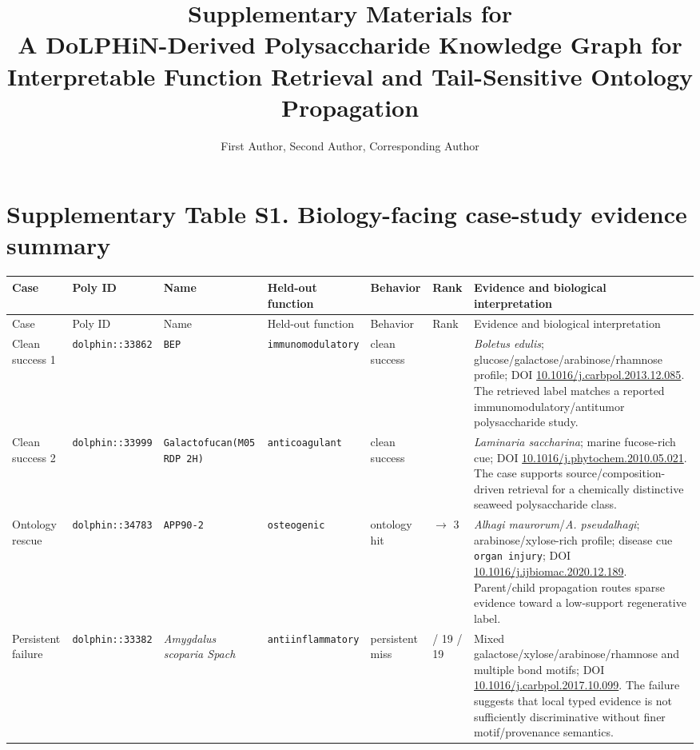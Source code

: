 \documentclass[11pt]{article}
\title{Supplementary Materials for\\A DoLPHiN-Derived Polysaccharide Knowledge Graph for Interpretable Function Retrieval and Tail-Sensitive Ontology Propagation}
\author{First Author, Second Author, Corresponding Author}
\date{}
\begin{document}
\maketitle
\setlength{\tabcolsep}{2pt}
\sloppy
\section*{Supplementary Table S1. Biology-facing case-study evidence summary}
\scriptsize
\begin{longtable}{>{\raggedright\arraybackslash}p{1.25cm}>{\raggedright\arraybackslash}p{1.25cm}>{\raggedright\arraybackslash}p{1.55cm}>{\raggedright\arraybackslash}p{1.45cm}>{\raggedright\arraybackslash}p{1.25cm}>{\raggedright\arraybackslash}p{0.9cm}>{\raggedright\arraybackslash}p{5.2cm}}
\toprule
Case & Poly ID & Name & Held-out function & Behavior & Rank & Evidence and biological interpretation \\
\midrule
\endfirsthead
\toprule
Case & Poly ID & Name & Held-out function & Behavior & Rank & Evidence and biological interpretation \\
\midrule
\endhead
Clean success 1 & \texttt{dolphin::33862} & \texttt{BEP} & \texttt{immunomodulatory} & clean success & 1 & \textit{Boletus edulis}; glucose/galactose/arabinose/rhamnose profile; DOI \url{10.1016/j.carbpol.2013.12.085}. The retrieved label matches a reported immunomodulatory/antitumor polysaccharide study. \\
Clean success 2 & \texttt{dolphin::33999} & \texttt{Galactofucan(M05 RDP 2H)} & \texttt{anticoagulant} & clean success & 1 & \textit{Laminaria saccharina}; marine fucose-rich cue; DOI \url{10.1016/j.phytochem.2010.05.021}. The case supports source/composition-driven retrieval for a chemically distinctive seaweed polysaccharide class. \\
Ontology rescue & \texttt{dolphin::34783} & \texttt{APP90-2} & \texttt{osteogenic} & ontology hit & 43 $\rightarrow$ 3 & \textit{Alhagi maurorum}/\textit{A. pseudalhagi}; arabinose/xylose-rich profile; disease cue \texttt{organ injury}; DOI \url{10.1016/j.ijbiomac.2020.12.189}. Parent/child propagation routes sparse evidence toward a low-support regenerative label. \\
Persistent failure & \texttt{dolphin::33382} & \textit{Amygdalus scoparia Spach} & \texttt{antiinflammatory} & persistent miss & 12 / 19 / 19 & Mixed galactose/xylose/arabinose/rhamnose and multiple bond motifs; DOI \url{10.1016/j.carbpol.2017.10.099}. The failure suggests that local typed evidence is not sufficiently discriminative without finer motif/provenance semantics. \\
\bottomrule
\end{longtable}
\normalsize
\end{document}

